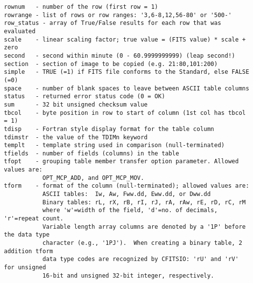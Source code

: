 \documentclass[11pt]{book}
\begin{document}
\begin{verbatim}
rownum   - number of the row (first row = 1)
rowrange - list of rows or row ranges: '3,6-8,12,56-80' or '500-'
row_status - array of True/False results for each row that was evaluated
scale    - linear scaling factor; true value = (FITS value) * scale + zero
second   - second within minute (0 - 60.9999999999) (leap second!)
section  - section of image to be copied (e.g. 21:80,101:200)
simple   - TRUE (=1) if FITS file conforms to the Standard, else FALSE (=0)
space    - number of blank spaces to leave between ASCII table columns
status   - returned error status code (0 = OK)
sum      - 32 bit unsigned checksum value
tbcol    - byte position in row to start of column (1st col has tbcol = 1)
tdisp    - Fortran style display format for the table column
tdimstr  - the value of the TDIMn keyword
templt   - template string used in comparison (null-terminated)
tfields  - number of fields (columns) in the table
tfopt    - grouping table member transfer option parameter. Allowed values are:
           OPT_MCP_ADD, and OPT_MCP_MOV.
tform    - format of the column (null-terminated); allowed values are:
           ASCII tables:  Iw, Aw, Fww.dd, Eww.dd, or Dww.dd
           Binary tables: rL, rX, rB, rI, rJ, rA, rAw, rE, rD, rC, rM
           where 'w'=width of the field, 'd'=no. of decimals, 'r'=repeat count.
           Variable length array columns are denoted by a '1P' before the data type
           character (e.g., '1PJ').  When creating a binary table, 2 addition tform
           data type codes are recognized by CFITSIO: 'rU' and 'rV' for unsigned
           16-bit and unsigned 32-bit integer, respectively.


\end{verbatim}
\end{document}
